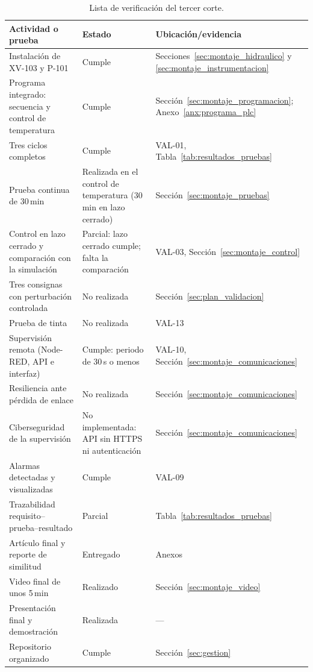 \begin{table}[H]\centering\small\caption{Lista de verificación del tercer corte.}
\label{tab:checklist_corte3}
\begin{tabularx}{\textwidth}{Y L{3.4cm} L{3.6cm}}\toprule
\textbf{Actividad o prueba}&\textbf{Estado}&\textbf{Ubicación/evidencia}\\\midrule
Instalación de XV-103 y P-101&Cumple&Secciones~\ref{sec:montaje_hidraulico} y \ref{sec:montaje_instrumentacion}\\
Programa integrado: secuencia y control de temperatura&Cumple&Sección~\ref{sec:montaje_programacion}; Anexo~\ref{anx:programa_plc}\\
Tres ciclos completos&Cumple&VAL-01, Tabla~\ref{tab:resultados_pruebas}\\
Prueba continua de 30\,min&Realizada en el control de temperatura (30\,min en lazo cerrado)&Sección~\ref{sec:montaje_pruebas}\\
Control en lazo cerrado y comparación con la simulación&Parcial: lazo cerrado cumple; falta la comparación&VAL-03, Sección~\ref{sec:montaje_control}\\
Tres consignas con perturbación controlada&No realizada&Sección~\ref{sec:plan_validacion}\\
Prueba de tinta&No realizada&VAL-13\\
Supervisión remota (Node-RED, API e interfaz)&Cumple: periodo de 30\,s o menos&VAL-10, Sección~\ref{sec:montaje_comunicaciones}\\
Resiliencia ante pérdida de enlace&No realizada&Sección~\ref{sec:montaje_comunicaciones}\\
Ciberseguridad de la supervisión&No implementada: API sin HTTPS ni autenticación&Sección~\ref{sec:montaje_comunicaciones}\\
Alarmas detectadas y visualizadas&Cumple&VAL-09\\
Trazabilidad requisito--prueba--resultado&Parcial&Tabla~\ref{tab:resultados_pruebas}\\
Artículo final y reporte de similitud&Entregado&Anexos\\
Video final de unos 5\,min&Realizado&Sección~\ref{sec:montaje_video}\\
Presentación final y demostración&Realizada&---\\
Repositorio organizado&Cumple&Sección~\ref{sec:gestion}\\\bottomrule
\end{tabularx}\end{table}

